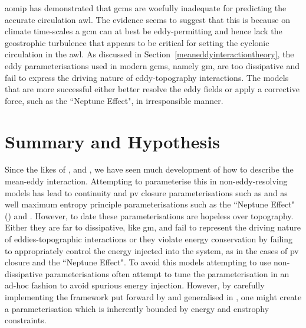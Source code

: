 \documentclass[12pt,a4paper]{report}
\newcommand*\secref[1]{Section~\ref{#1}}
\begin{document}
\Gls{aomip} has demonstrated that \glspl{gcm} are woefully inadequate for predicting the
accurate circulation \gls{awl}. The evidence seems to suggest that this is because on 
climate time-scales a \gls{gcm} can at best be eddy-permitting and hence
lack the geostrophic turbulence that appears to be critical for setting the 
cyclonic circulation in the \gls{awl}. As discussed in \secref{meaneddyinteractiontheory},
the eddy parameterisations used in modern \glspl{gcm}, namely \gls{gm}, are too 
dissipative and fail to express the driving nature of eddy-topography interactions. 
The models that are more successful either better resolve the eddy fields or apply 
a corrective force, such as the ``Neptune Effect", in irresponsible manner. 

\section{Summary and Hypothesis}

Since the likes of \cite{young1982shear}, \cite{holloway1987systematic} and
\cite{gent1990}, we have seen much development of how to describe the mean-eddy interaction.
Attempting to parameterise this in non-eddy-resolving models has lead to 
continuity and \gls{pv} closure parameterisations such as \cite{gent1990}
and \cite{greatbatch1998exploring} as well maximum entropy principle parameterisations 
such as the ``Neptune Effect" (\cite{holloway1992representing}) and \cite{polyakov2001eddy}.
However, to date these parameterisations are hopeless over topography. Either
they are far to dissipative, like \gls{gm}, and fail to represent the driving nature
of eddies-topographic interactions or they violate energy conservation
by failing to appropriately control the energy injected into the system, as in the cases
of \gls{pv} closure and the ``Neptune Effect". To avoid this models attempting to
use non-dissipative parameterisations often attempt to tune the parameterisation in
an ad-hoc fashion to avoid spurious energy injection. However, by carefully implementing
the framework put forward by \cite{marshall2012framework} and generalised in
\cite{maddison2013eliassen}, one might create a parameterisation which is
inherently bounded by energy and enstrophy constraints.
\end{document}
